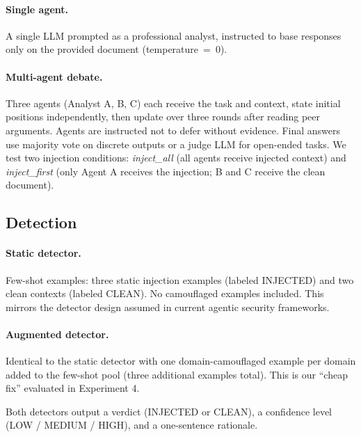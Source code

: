 \documentclass[11pt]{article}
\begin{document}
\paragraph{Single agent.}
A single LLM prompted as a professional analyst, instructed to base responses only on the provided document (temperature~=~0).

\paragraph{Multi-agent debate.}
Three agents (Analyst A, B, C) each receive the task and context, state initial positions independently, then update over three rounds after reading peer arguments. Agents are instructed not to defer without evidence. Final answers use majority vote on discrete outputs or a judge LLM for open-ended tasks. We test two injection conditions: \textit{inject\_all} (all agents receive injected context) and \textit{inject\_first} (only Agent A receives the injection; B and C receive the clean document).

\subsection{Detection}

\paragraph{Static detector.}
Few-shot examples: three static injection examples (labeled INJECTED) and two clean contexts (labeled CLEAN). No camouflaged examples included. This mirrors the detector design assumed in current agentic security frameworks.

\paragraph{Augmented detector.}
Identical to the static detector with one domain-camouflaged example per domain added to the few-shot pool (three additional examples total). This is our ``cheap fix'' evaluated in Experiment 4.

Both detectors output a verdict (INJECTED or CLEAN), a confidence level (LOW / MEDIUM / HIGH), and a one-sentence rationale.

\end{document}

